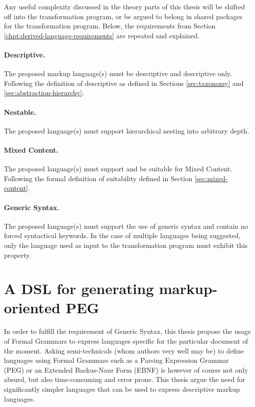 \documentclass{scrreprt}
\begin{document}
Any useful complexity discussed in the theory parts of this thesis will be shifted off into the transformation program, or be argued to belong in shared packages for the transformation program. Below, the requirements from Section \ref{chpt:derived-language-requirements} are repeated and explained.


\paragraph{Descriptive.} The proposed markup language(s) must be descriptive and descriptive only. Following the definition of descriptive as defined in Sections \ref{sec:taxonomy} and \ref{sec:abstraction-hierarchy}.


\paragraph{Nestable.} The proposed language(s) must support hierarchical nesting into arbitrary depth.


\paragraph{Mixed Content.} The proposed language(s) must support and be suitable for Mixed Content. Following the formal definition of suitability defined in Section \ref{sec:mixed-content}.


\paragraph{Generic Syntax.} The proposed language(s) must support the use of generic syntax and contain no forced syntactical keywords. In the case of multiple languages being suggested, only the language used as input to the transformation program must exhibit this property.




\section{A DSL for generating markup-oriented PEG}
In order to fulfill the requirement of Generic Syntax, this thesis propose the usage of Formal Grammars to express languages specific for the particular document of the moment. Asking semi-technicals (whom authors very well may be) to define languages using Formal Grammars such as a Parsing Expression Grammar (PEG) or an Extended Backus-Naur Form (EBNF) is however of course not only absurd, but also time-consuming and error prone. This thesis argue the need for significantly simpler languages that can be used to express descriptive markup languages.
\end{document}
